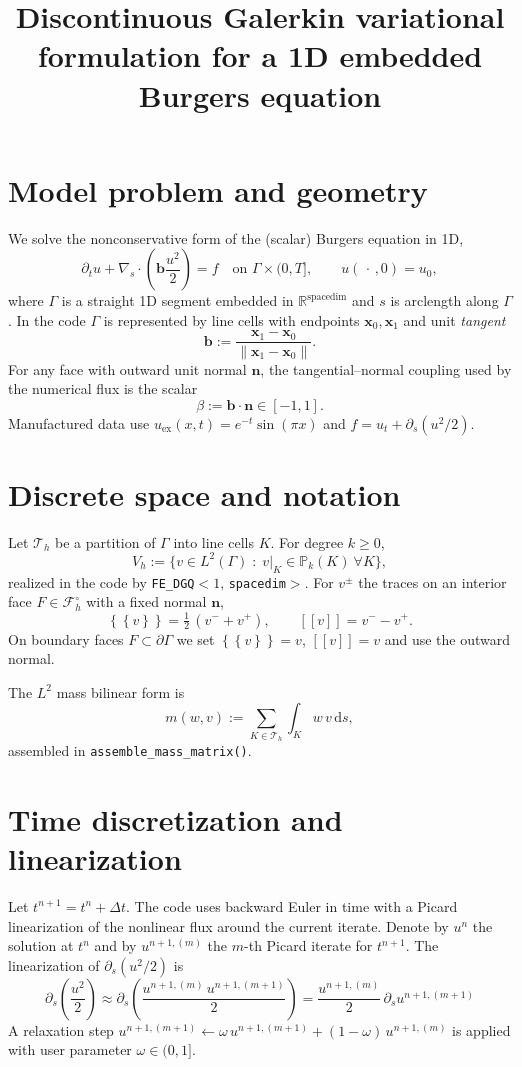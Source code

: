 \documentclass[11pt]{article}
\title{Discontinuous Galerkin variational formulation for a 1D embedded Burgers equation}
\author{}
\date{}
\newcommand{\R}{\mathbb{R}}
\newcommand{\avg}[1]{\left\{\!\!\left\{#1\right\}\!\!\right\}}
\newcommand{\jump}[1]{\left[\!\left[#1\right]\!\right]}
\newcommand{\dt}{\Delta t}
\newcommand{\Vh}{V_h}
\newcommand{\Th}{\mathcal{T}_h}
\newcommand{\Fh}{\mathcal{F}_h}
\newcommand{\Kh}{K}
\begin{document}
\maketitle

\section{Model problem and geometry}
We solve the nonconservative form of the (scalar) Burgers equation in 1D,
\begin{equation}
  \partial_t u + \nabla_s \cdot \!\left(\bm b\frac{u^2}{2}\right) = f
  \quad\text{on } \Gamma\times(0,T],\qquad
  u(\,\cdot\,,0)=u_0,
  \label{eq:model}
\end{equation}
where $\Gamma$ is a straight 1D segment embedded in $\R^{\text{spacedim}}$ and
$s$ is arclength along $\Gamma$. In the code $\Gamma$ is represented by
line cells with endpoints $\bm x_0,\bm x_1$ and unit \emph{tangent}
\[
\bm b := \frac{\bm x_1-\bm x_0}{\lVert \bm x_1-\bm x_0\rVert}.
\]
For any face with outward unit normal $\bm n$, the tangential--normal coupling used by the numerical flux is the scalar
\[
\beta := \bm b\cdot \bm n\in[-1,1].
\]
Manufactured data use
$u_{\text{ex}}(x,t)=e^{-t}\sin(\pi x)$ and $f=u_t+\partial_s(u^2/2)$.

\section{Discrete space and notation}
Let $\Th$ be a partition of $\Gamma$ into line cells $\Kh$. For degree $k\ge0$,
\[
\Vh := \{ v\in L^2(\Gamma)\;:\; v|_{\Kh}\in\mathbb P_k(\Kh)\ \forall \Kh\},
\]
realized in the code by \texttt{FE\_DGQ$<1,\,$spacedim$>$}. For $v^\pm$ the traces on an interior face $F\in\Fh^\circ$ with a fixed normal $\bm n$,
\[
\avg{v}=\tfrac12\,(v^-+v^+),\qquad
\jump{v}=v^- - v^+ .
\]
On boundary faces $F\subset\partial\Gamma$ we set $\avg{v}=v$, $\jump{v}=v$ and use the outward normal.

The $L^2$ mass bilinear form is
\[
m(w,v) := \sum_{\Kh\in\Th}\int_{\Kh} w\,v\,\mathrm ds ,
\]
assembled in \texttt{assemble\_mass\_matrix()}.

\section{Time discretization and linearization}
Let $t^{n+1}=t^n+\dt$. The code uses backward Euler in time with a Picard linearization of the nonlinear flux around the current iterate.
Denote by $u^{n}$ the solution at $t^n$ and by $u^{n+1,(m)}$ the $m$-th Picard iterate for $t^{n+1}$.
The linearization of $\partial_s(u^2/2)$ is
\[
\partial_s\!\left(\frac{u^2}{2}\right)
\approx \partial_s\!\left(\frac{u^{n+1, (m)}\,u^{n+1,(m+1)}}{2}\right)
= \frac{u^{n+1, (m)}}{2}\,\partial_s u^{n+1,(m+1)} 
\]
A relaxation step $u^{n+1,(m+1)} \leftarrow \omega\,u^{n+1,(m+1)} +
(1-\omega)\,u^{n+1,(m)}$ is applied with user parameter $\omega\in(0,1]$.
\end{document}
